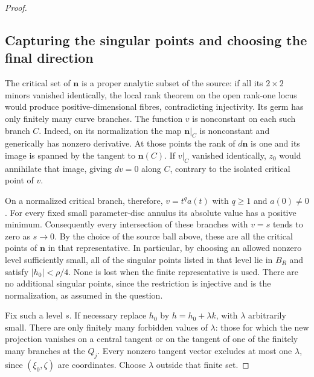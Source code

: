\documentclass[11pt,a4paper]{article}
\theoremstyle{remark}
\begin{document}
\begin{proof}
\subsection{Capturing the singular points and choosing the final direction}

The critical set of $\boldsymbol n$ is a proper analytic subset of the
source: if all its $2\times2$ minors vanished identically, the local
rank theorem on the open rank-one locus would produce positive-dimensional
fibres, contradicting injectivity.  Its germ has only finitely many
curve branches.  The function $v$ is nonconstant on each such branch
$C$.  Indeed, on its normalization the map
$\boldsymbol n|_C$ is nonconstant and generically has nonzero derivative.
At those points the rank of $d\boldsymbol n$ is one and its image is
spanned by the tangent to $\boldsymbol n(C)$.  If $v|_C$ vanished
identically, $z_0$ would annihilate that image, giving $dv=0$ along
$C$, contrary to the isolated critical point of $v$.

On a normalized critical branch, therefore,
$v=t^q a(t)$ with $q\ge1$ and $a(0)\ne0$.  For every fixed small
parameter-disc annulus its absolute value has a positive minimum.
Consequently every intersection of these branches with $v=s$ tends to
zero as $s\to0$.  By the choice of the source ball above, these
are all the critical points of $\boldsymbol n$ in that representative.
In particular,
by choosing an allowed nonzero level sufficiently small, all of the
singular points listed in that level lie in $B_R$ and satisfy
$|h_0|<\rho/4$.  None is lost when the finite representative is used.
There are no additional singular points, since the restriction is
injective and is the normalization, as assumed in the question.

Fix such a level $s$.  If necessary replace
$h_0$ by $h=h_0+\lambda k$, with $\lambda$ arbitrarily small.  There
are only finitely many forbidden values of $\lambda$: those for which
the new projection vanishes on a central tangent or on the tangent of
one of the finitely many branches at the $Q_j$.  Every nonzero tangent
vector excludes at most one $\lambda$, since $(\xi_0,\zeta)$ are
coordinates.  Choose $\lambda$ outside that finite set.


\end{proof}
\end{document}
